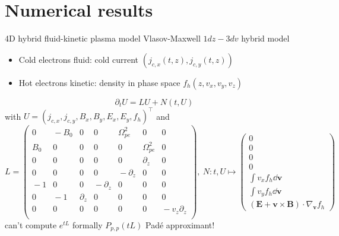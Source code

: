 \documentclass{beamer}
\newcommand{\cmark}{{\color{dgreen}\ding{52}}}
\newcommand{\xmark}{{\color{red}\ding{55}}}
\newcommand{\arrow}{{\color{PLB}\ding{220}}}
\newcommand{\Mvb}[1]{\boldsymbol{#1}}
\begin{document}
\section{Numerical results}
\begin{frame}{4D hybrid fluid-kinetic plasma model}
  Vlasov-Maxwell $1dz-3dv$ hybrid model
  \begin{itemize}
    \item Cold electrons \arrow fluid: cold current $(j_{c,x}(t,z),j_{c,y}(t,z))$
    \item Hot electrons \arrow kinetic: density in phase space $f_h(z,v_x,v_y,v_z)$
  \end{itemize}

  $$
    \partial_t U = LU + N(t,U)
  $$
  with $U = (j_{c,x},j_{c,y},B_x,B_y,E_x,E_y,f_h)^\top$ and
  $$
    L \!=\!\begin{pmatrix}
      0        & \!-\!B_0\! & 0              &  0                &  \!\Omega_{pe}^2\! & 0                 & 0 \\ 
      \!B_0\!  &  0         & 0              &  0                &  0                 & \!\Omega_{pe}^2\! & 0 \\
      0        &  0         & 0              &  0                &  0                 & \partial_z        & 0 \\ 
      0        &  0         & 0              &  0                & \!-\!\partial_z\!  & 0                 & 0 \\ 
      \!-\!1\! &  0         & 0              & \!-\!\partial_z\! &  0                 & 0                 & 0 \\ 
      0        & \!-\!1\!   & \!\partial_z\! &  0                &  0                 & 0                 & 0 \\ 
      0        &  0         & 0              &  0                &  0                 & 0                 & \!\!\!\!\!-\!v_z\partial_z\! \\ 
    \end{pmatrix}
    ,\ 
    N\!:\!t,U\mapsto\!\begin{pmatrix}
      0 \\
      0 \\
      0 \\
      0 \\
      \int v_xf_h\dd{\Mvb{v}} \\
      \int v_yf_h\dd{\Mvb{v}} \\
      (\Mvb{E}\!+\!\Mvb{v}\times\Mvb{B})\!\cdot\!\nabla_{\!\Mvb{v}}f_h
    \end{pmatrix}
  $$
  \xmark can't compute $e^{tL}$ formally \hfill \cmark $P_{p,p}(tL)$ Padé approximant!
\end{frame}
\end{document}
